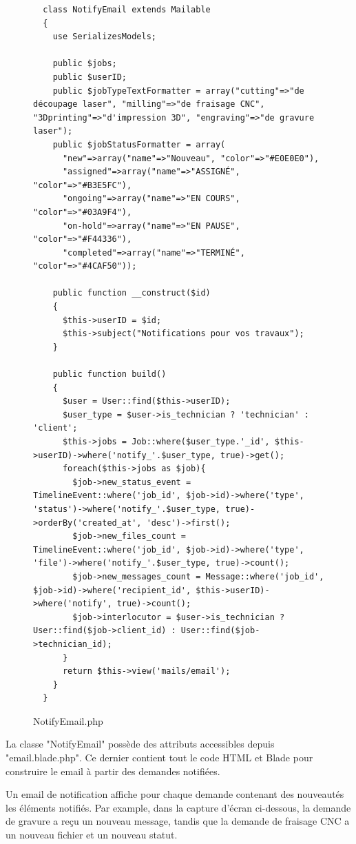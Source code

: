 \documentclass[
    iai, %
    eai, %
]{heig-tb}
\begin{document}
\begin{figure}[h]
  \begin{verbatim}
  class NotifyEmail extends Mailable
  {
    use SerializesModels;

    public $jobs;
    public $userID;
    public $jobTypeTextFormatter = array("cutting"=>"de découpage laser", "milling"=>"de fraisage CNC", "3Dprinting"=>"d'impression 3D", "engraving"=>"de gravure laser");
    public $jobStatusFormatter = array(
      "new"=>array("name"=>"Nouveau", "color"=>"#E0E0E0"),
      "assigned"=>array("name"=>"ASSIGNÉ", "color"=>"#B3E5FC"),
      "ongoing"=>array("name"=>"EN COURS", "color"=>"#03A9F4"),
      "on-hold"=>array("name"=>"EN PAUSE", "color"=>"#F44336"),
      "completed"=>array("name"=>"TERMINÉ", "color"=>"#4CAF50"));

    public function __construct($id)
    {
      $this->userID = $id;
      $this->subject("Notifications pour vos travaux");
    }

    public function build()
    {
      $user = User::find($this->userID);
      $user_type = $user->is_technician ? 'technician' : 'client';
      $this->jobs = Job::where($user_type.'_id', $this->userID)->where('notify_'.$user_type, true)->get();
      foreach($this->jobs as $job){
        $job->new_status_event = TimelineEvent::where('job_id', $job->id)->where('type', 'status')->where('notify_'.$user_type, true)->orderBy('created_at', 'desc')->first();
        $job->new_files_count = TimelineEvent::where('job_id', $job->id)->where('type', 'file')->where('notify_'.$user_type, true)->count();
        $job->new_messages_count = Message::where('job_id', $job->id)->where('recipient_id', $this->userID)->where('notify', true)->count();
        $job->interlocutor = $user->is_technician ? User::find($job->client_id) : User::find($job->technician_id);
      }
      return $this->view('mails/email');
    }
  }
  \end{verbatim}
  \caption{NotifyEmail.php}
\end{figure}

La classe "NotifyEmail" possède des attributs accessibles depuis "email.blade.php". Ce dernier contient tout le code HTML et Blade pour construire le email à partir des demandes notifiées.

\newpage
Un email de notification affiche pour chaque demande contenant des nouveautés les éléments notifiés. Par example, dans la capture d'écran ci-dessous, la demande de gravure a reçu un nouveau message, tandis que la demande de fraisage CNC a un nouveau fichier et un nouveau statut.
\end{document}
